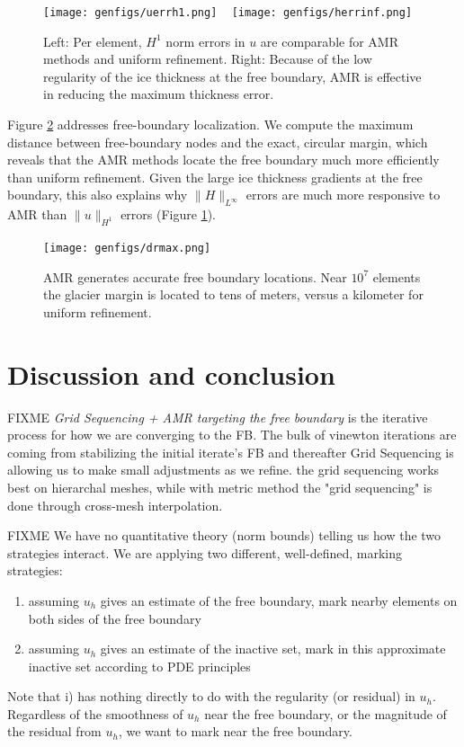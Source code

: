 \documentclass[]{interact}
\theoremstyle{plain}%
\theoremstyle{definition}
\theoremstyle{remark}
\begin{document}
\begin{figure}[ht]
\noindent\mbox{\texttt{[image: genfigs/uerrh1.png]} \, \texttt{[image: genfigs/herrinf.png]}}
\caption{Left: Per element, $H^1$ norm errors in $u$ are comparable for AMR methods and uniform refinement.  Right: Because of the low regularity of the ice thickness at the free boundary, AMR is effective in reducing the maximum thickness error.}
\label{fig:domenormresults}
\end{figure}

Figure \ref{fig:domeradiusresults} addresses free-boundary localization.  We compute the maximum distance between free-boundary nodes and the exact, circular margin, which reveals that the AMR methods locate the free boundary much more efficiently than uniform refinement.  Given the large ice thickness gradients at the free boundary, this also explains why $\|H\|_{L^\infty}$ errors are much more responsive to AMR than $\|u\|_{H^1}$ errors (Figure \ref{fig:domenormresults}).

\begin{figure}[ht]
\centering
\texttt{[image: genfigs/drmax.png]}
\caption{AMR generates accurate free boundary locations.  Near $10^7$ elements the glacier margin is located to tens of meters, versus a kilometer for uniform refinement.}
\label{fig:domeradiusresults}
\end{figure}


\section{Discussion and conclusion} \label{sec:conclusion}

FIXME \emph{Grid Sequencing + AMR targeting the free boundary} is the iterative process for how we are converging to the FB.  The bulk of vinewton iterations are coming from stabilizing the initial iterate's FB and thereafter Grid Sequencing is allowing us to make small adjustments as we refine.  the grid sequencing works best on hierarchal meshes, while with metric method the "grid sequencing" is done through cross-mesh interpolation.

FIXME We have no quantitative theory (norm bounds) telling us how the two strategies interact.  We are applying two different, well-defined, marking strategies:
\begin{enumerate}
\item assuming $u_h$ gives an estimate of the free boundary, mark nearby elements on both sides of the free boundary
\item assuming $u_h$ gives an estimate of the inactive set, mark in this approximate inactive set according to PDE principles
\end{enumerate}
Note that i) has nothing directly to do with the regularity (or residual) in $u_h$.  Regardless of the smoothness of $u_h$ near the free boundary, or the magnitude of the residual from $u_h$, we want to mark near the free boundary.
\end{document}
